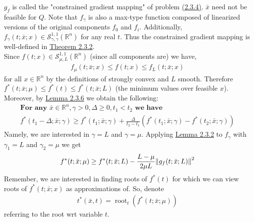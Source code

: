 \documentclass[12pt,a4paper]{article}
\DeclareMathOperator*{\Root}{root}
\begin{document}
	$g_f$ is called the "constrained gradient mapping" of problem \hyperref[sec:234]{(2.3.4)}. $\bar{x}$ need not be feasible for $Q$. Note that $f_{\gamma}$ is also a max-type function composed of linearized versions of the original components $f_0$ and $f_i$. Additionally, $f_{\gamma}(t;\bar{x};x) \in \mathcal{S}_{\gamma,\gamma}^{1,1}(\mathbb{R}^n)$ for any real $t$. Thus the constrained gradient mapping is well-defined in \hyperref[thm232]{Theorem 2.3.2}. \\
	Since $f(t;x)\in \mathcal{S}_{\mu,L}^{1,1}(\mathbb{R}^n)$ (since all components are) we have,
	\begin{align*}
		f_{\mu}(t;\bar{x};x) \leq f(t;x) \leq f_{L}(t;\bar{x};x)
	\end{align*}
	for all $x \in \mathbb{R}^n$ by the definitions of strongly convex and $L$ smooth. Therefore $f^*(t;\bar{x};\mu) \leq f^*(t) \leq f^*(t;\bar{x};L)$ (the minimum values over feasible $x$). Moreover, by \hyperref[lem236]{Lemma 2.3.6} we obtain the following: 
	\begin{align}
		\textbf{For any  } \bar{x}\in \mathbb{R}^n, \gamma > 0, \Delta \geq 0, t_1 < t_2 \textbf{ we have} \nonumber \\
		f^*(t_1 - \Delta;\bar{x};\gamma) \geq f^*(t_1;\bar{x};\gamma) + \frac{\Delta}{t_2 - t_1}(f^*(t_1;\bar{x};\gamma) - f^*(t_2;\bar{x};\gamma))
	\end{align}
	Namely, we are interested in $\gamma = L$ and $\gamma=\mu$. Applying \hyperref[lem232]{Lemma 2.3.2} to $f_{\gamma}$ with $\gamma_1 = L$ and $\gamma_2 = \mu$ we get
	\begin{align*}
		f^*(t;\bar{x};\mu) \geq f^*(t;\bar{x};L) - \frac{L - \mu}{2\mu L}\norm{g_f(t;\bar{x};L)}^2
	\end{align*}
	Remember, we are interested in finding roots of $f^*(t)$ for which we can view roots of $f^*(t;\bar{x};x)$ as approximations of. So, denote
	\begin{align*}
		t^*(\bar{x},t) = \Root_{t}(f^*(t;\bar{x};\mu))
	\end{align*}
	referring to the root wrt variable $t$.
\end{document}

